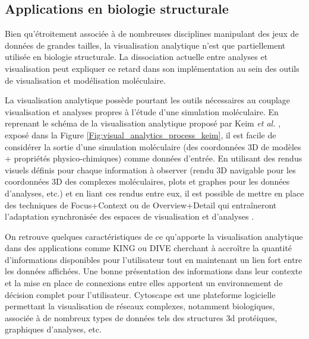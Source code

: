 \subsection{Applications en biologie structurale}
\label{Sec:visuAnalyticsStructBio}

Bien qu'étroitement associée à de nombreuses disciplines manipulant des jeux de données de grandes tailles, la visualisation analytique n'est que partiellement utilisée en biologie structurale. La dissociation actuelle entre analyses et visualisation peut expliquer ce retard dans son implémentation au sein des outils de visualisation et modélisation moléculaire.

La visualisation analytique possède pourtant les outils nécessaires au couplage visualisation et analyses propres à l'étude d'une simulation moléculaire. En reprenant le schéma de la visualisation analytique proposé par Keim \textit{et al.} \cite{keim2010mastering}, exposé dans la Figure \ref{Fig:visual_analytics_process_keim}, il est facile de considérer la sortie d'une simulation moléculaire (des coordonnées 3D de modèles + propriétés physico-chimiques) comme données d'entrée. En utilisant des rendus visuels définis pour chaque information à observer (rendu 3D navigable pour les coordonnées 3D des complexes moléculaires, plots et graphes pour les données d'analyses, etc.) et en liant ces rendus entre eux, il est possible de mettre en place des techniques de Focus+Context ou de Overview+Detail qui entraîneront l'adaptation synchronisée des espaces de visualisation et d'analyses \cite{schulz2011visual,kerren_toward_2012}.

On retrouve quelques caractéristiques de ce qu'apporte la visualisation analytique dans des applications comme KING \cite{chen_king_2009} ou DIVE \cite{rysavy_dive:_2014} cherchant à accroître la quantité d'informations disponibles pour l'utilisateur tout en maintenant un lien fort entre les données affichées. Une bonne présentation des informations dans leur contexte et la mise en place de connexions entre elles apportent un environnement de décision complet pour l'utilisateur. Cytoscape \cite{shannon_cytoscape:_2003,doncheva_topological_2012} est une plateforme logicielle permettant la visualisation de réseaux complexes, notamment biologiques, associée à de nombreux types de données tels des structures 3d protéiques, graphiques d'analyses, etc.

